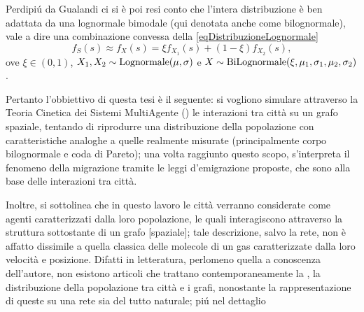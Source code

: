   Perdipiú da Gualandi \etal{} \cite{Gualandi2019HBLD,Gualandi2019SDC} ci si è poi resi conto che l'intera distribuzione è ben adattata da una lognormale bimodale (qui denotata anche come bilognormale), vale a dire una combinazione convessa della \eqref{eqDistribuzioneLognormale}
  \begin{equation}
    \label{eqDistribuzioneLognormaleBimodale}
    f_S(s)\approx f_X(s)=\xi f_{X_1}(s)+(1-\xi)f_{X_2}(s),
  \end{equation}
  ove \(\xi\in(0,1)\), \(X_1,X_2\sim\operatorname{Lognormale}(\mu,\sigma)\) e \(X\sim\operatorname{BiLognormale}(\xi,\mu_1,\sigma_1,\mu_2,\sigma_2)\).

  Pertanto l'obbiettivo di questa tesi è il seguente: si vogliono simulare attraverso la \hypertarget{acrTeorieCineticheSistemiMultiAgenti}{Teoria Cinetica dei Sistemi MultiAgente} (\TCSMA) le interazioni tra città su un grafo spaziale, tentando di riprodurre una distribuzione della popolazione con caratteristiche analoghe a quelle realmente misurate (principalmente corpo bilognormale e coda di Pareto); una volta raggiunto questo scopo, s'interpreta il fenomeno della migrazione tramite le leggi d'emigrazione proposte, che sono alla base delle interazioni tra città.

  Inoltre, si sottolinea che in questo lavoro le città verranno considerate come agenti caratterizzati dalla loro popolazione, le quali interagiscono attraverso la struttura sottostante di un grafo [spaziale]; tale descrizione, salvo la rete, non è affatto dissimile a quella classica delle molecole di un gas caratterizzate dalla loro velocità e posizione. Difatti in letteratura, perlomeno quella a conoscenza dell'autore, non esistono articoli che trattano contemporaneamente la \TCSMA{}, la distribuzione della popolazione tra città e i grafi, nonostante la rappresentazione di queste su una rete sia del tutto naturale; piú nel dettaglio
  
